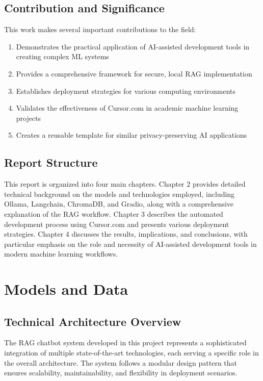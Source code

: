 \documentclass[12pt,letterpaper]{article}
\begin{document}
\subsection{Contribution and Significance}

This work makes several important contributions to the field:

\begin{enumerate}
    \item Demonstrates the practical application of AI-assisted development tools in creating complex ML systems
    \item Provides a comprehensive framework for secure, local RAG implementation
    \item Establishes deployment strategies for various computing environments
    \item Validates the effectiveness of Cursor.com in academic machine learning projects
    \item Creates a reusable template for similar privacy-preserving AI applications
\end{enumerate}

\subsection{Report Structure}

This report is organized into four main chapters. Chapter 2 provides detailed technical background on the models and technologies employed, including Ollama, Langchain, ChromaDB, and Gradio, along with a comprehensive explanation of the RAG workflow. Chapter 3 describes the automated development process using Cursor.com and presents various deployment strategies. Chapter 4 discusses the results, implications, and conclusions, with particular emphasis on the role and necessity of AI-assisted development tools in modern machine learning workflows.

\newpage

\section{Models and Data}

\subsection{Technical Architecture Overview}

The RAG chatbot system developed in this project represents a sophisticated integration of multiple state-of-the-art technologies, each serving a specific role in the overall architecture. The system follows a modular design pattern that ensures scalability, maintainability, and flexibility in deployment scenarios.
\end{document}
